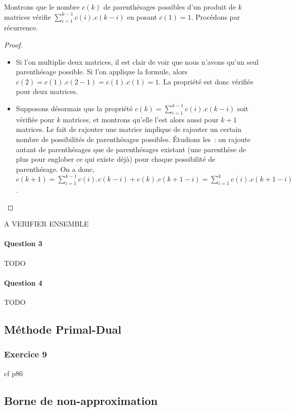\documentclass[a4paper, 12pt]{article}
\begin{document}
Montrons que le nombre $c(k)$ de parenthésages possibles d'un produit
de $k$ matrices vérifie $\sum_{i=1}^{k-1}c(i).c(k-i)$ en posant
$c(1)=1$. Procédons par récurrence.

\begin{proof}
\begin{itemize}
\item Si l'on multiplie deux matrices, il est clair de voir que nous
  n'avons qu'un seul parenthésage possible. Si l'on applique la
  formule, alors $c(2) = c(1).c(2-1) = c(1).c(1) = 1$. La propriété
  est donc vérifiée pour deux matrices.
\item Supposons désormais que la propriété $c(k) =
  \sum_{i=1}^{k-1}c(i).c(k-i)$ soit vérifiée pour $k$ matrices, et
  montrons qu'elle l'est alors aussi pour $k+1$ matrices. Le fait de
  rajouter une matrice implique de rajouter un certain nombre de
  possibilités de parenthésages possibles. Étudions les~: on rajoute
  autant de parenthésages que de parenthésages existant (une
  parenthèse de plus pour englober ce qui existe déjà) pour chaque
  possibilité de parenthésage. On a donc, $c(k+1)
  =\sum_{i=1}^{k-1}c(i).c(k-i)+c(k).c(k+1-i)= \sum_{i=1}^{k}c(i).c(k+1-i)$.
\end{itemize}
\end{proof}
A VERIFIER ENSEMBLE

\paragraph{Question 3}

TODO

\paragraph{Question 4}

TODO

\subsection{Méthode Primal-Dual}

\subsubsection*{Exercice 9}

cf p86

\subsection{Borne de non-approximation}
\end{document}

